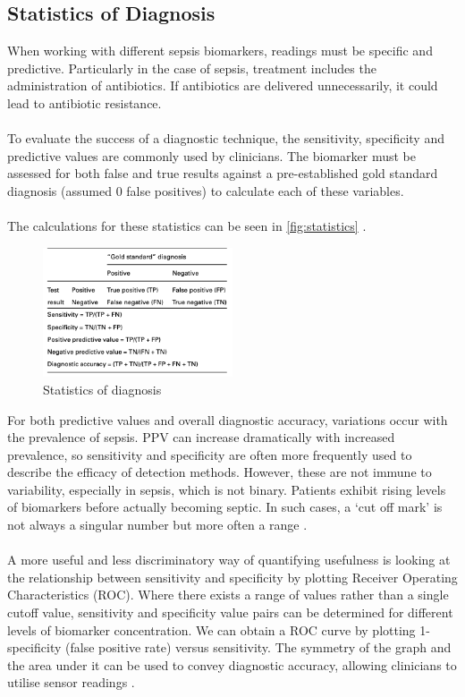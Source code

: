 \subsection{Statistics of Diagnosis}
When working with different sepsis biomarkers, readings must be specific and predictive. Particularly in the case of sepsis, treatment includes the administration of antibiotics. If antibiotics are delivered unnecessarily, it could lead to antibiotic resistance.\\\\
To evaluate the success of a  diagnostic technique, the sensitivity, specificity and predictive values are commonly used by clinicians. The biomarker must be assessed for both false and true results against a pre-established gold standard diagnosis (assumed 0 false positives) to calculate each of these variables.\\\\
The calculations for these statistics can be seen in \autoref{fig:statistics}
\cite{christenson2007evidence}.
\begin{figure}[h]
    \centering
    \includegraphics[width=0.5\textwidth]{img/statistics of diagnosis.png}
    \caption{Statistics of diagnosis \cite{christenson2007evidence}}
    \label{fig:statistics}
\end{figure}
For both predictive values and overall diagnostic accuracy, variations occur with the prevalence of sepsis. PPV can increase dramatically with increased prevalence, so sensitivity and specificity are often more frequently used to describe the efficacy of detection methods.  However, these are not immune to variability, especially in sepsis, which is not binary.  Patients exhibit rising levels of biomarkers before actually becoming septic. In such cases, a ‘cut off mark’ is not always a singular number but more often a range \cite{xia2013translational}. \\\\
A more useful and less discriminatory way of quantifying usefulness is looking at the relationship between sensitivity and specificity by plotting Receiver Operating Characteristics (ROC). Where there exists a range of values rather than a single cutoff value, sensitivity and specificity value pairs can be determined for different levels of biomarker concentration. We can obtain a ROC curve by plotting 1-specificity (false positive rate) versus sensitivity. The symmetry of the graph and the area under it can be used to convey diagnostic accuracy, allowing clinicians to utilise sensor readings \cite{kampfrath2013brief}. 
